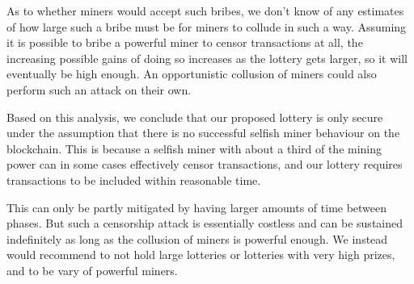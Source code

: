 As to whether miners would accept such bribes, we don't know of any estimates of how large such a bribe must be for miners to collude in such a way. Assuming it is possible to bribe a powerful miner to censor transactions at all, the increasing possible gains of doing so increases as the lottery gets larger, so it will eventually be high enough. An opportunistic collusion of miners could also perform such an attack on their own.

Based on this analysis, we conclude that our proposed lottery is only secure under the assumption that there is no successful selfish miner behaviour on the blockchain. This is because a selfish miner with about a third of the mining power can in some cases effectively censor transactions, and our lottery requires transactions to be included within reasonable time. 

This can only be partly mitigated by having larger amounts of time between phases. But such a censorship attack is essentially costless and can be sustained indefinitely as long as the collusion of miners is powerful enough. We instead would recommend to not hold large lotteries or lotteries with very high prizes, and to be vary of powerful miners.
